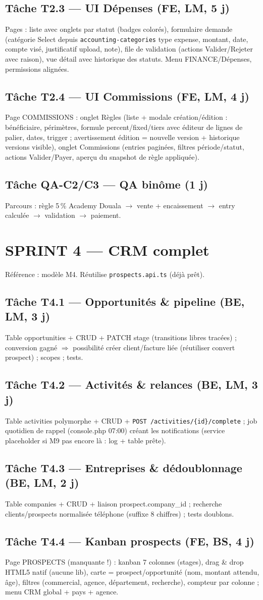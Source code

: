 \documentclass[11pt,a4paper]{article}
\newcommand{\tache}[2]{\subsection{Tâche #1 --- #2}\label{task:#1}}
\begin{document}
\tache{T2.3}{UI Dépenses (FE, LM, 5 j)}
Pages : liste avec onglets par statut (badges colorés), formulaire demande (catégorie Select depuis \verb|accounting-categories| type expense, montant, date, compte visé, justificatif upload, note), file de validation (actions Valider/Rejeter avec raison), vue détail avec historique des statuts. Menu FINANCE/Dépenses, permissions alignées.

\tache{T2.4}{UI Commissions (FE, LM, 4 j)}
Page COMMISSIONS : onglet Règles (liste + modale création/édition : bénéficiaire, périmètres, formule percent/fixed/tiers avec éditeur de lignes de palier, dates, trigger ; avertissement \og édition = nouvelle version \fg{} + historique versions visible), onglet Commissions (entries paginées, filtres période/statut, actions Valider/Payer, aperçu du snapshot de règle appliquée).

\tache{QA-C2/C3}{QA binôme (1 j)} Parcours : règle 5\,\% Academy Douala $\rightarrow$ vente + encaissement $\rightarrow$ entry calculée $\rightarrow$ validation $\rightarrow$ paiement.

\section{SPRINT 4 --- CRM complet}

Référence : modèle M4. Réutilise \verb|prospects.api.ts| (déjà prêt).

\tache{T4.1}{Opportunités \& pipeline (BE, LM, 3 j)} Table opportunities + CRUD + PATCH stage (transitions libres tracées) ; conversion gagné $\Rightarrow$ possibilité créer client/facture liée (réutiliser convert prospect) ; scopes ; tests.

\tache{T4.2}{Activités \& relances (BE, LM, 3 j)} Table activities polymorphe + CRUD + \verb|POST /activities/{id}/complete| ; job quotidien de rappel (console.php 07:00) créant les notifications (service placeholder si M9 pas encore là : log + table prête).

\tache{T4.3}{Entreprises \& dédoublonnage (BE, LM, 2 j)} Table companies + CRUD + liaison prospect.company_id ; recherche clients/prospects normalisée téléphone (suffixe 8 chiffres) ; tests doublons.

\tache{T4.4}{Kanban prospects (FE, BS, 4 j)} Page PROSPECTS (manquante !) : kanban 7 colonnes (stages), drag \& drop HTML5 natif (aucune lib), carte = prospect/opportunité (nom, montant attendu, âge), filtres (commercial, agence, département, recherche), compteur par colonne ; menu CRM global + pays + agence.
\end{document}
